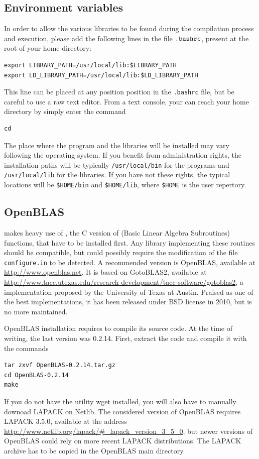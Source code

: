 \subsection{Environment variables}

In order to allow the various libraries to be found during the
compilation process and execution, please add
the following lines in the file $\verb|.bashrc|$, present at the
root of your home directory:
\begin{verbatim}
export LIBRARY_PATH=/usr/local/lib:$LIBRARY_PATH
export LD_LIBRARY_PATH=/usr/local/lib:$LD_LIBRARY_PATH
\end{verbatim}
This line can be placed at any position position in the
\verb|.bashrc| file, but be careful to use a raw text editor. From a
text console, your can reach your home directory by simply enter the
command
\begin{verbatim}
cd
\end{verbatim}

The place where the program and the libraries will be installed may vary
following the operating system.
If you benefit from administration rights, the installation paths will
be typically \verb|/usr/local/bin| for the programs and
\verb|/usr/local/lib| for the libraries.
If you have not these rights, the typical locations will be
\verb|$HOME/bin| and \verb|$HOME/lib|, where \verb|$HOME| is the user
repertory.

\subsection{OpenBLAS}
\label{sec:blas}

\oratio{} makes heavy use of \cblas{}, the C version of \blas{} (Basic Linear Algebra Subroutines) functions, that have to be installed first.
Any library implementing these routines should be compatible, but could possibly
require the modification of the file \verb|configure.in| to be
detected.
A recommended version is \textsf{OpenBLAS}, available at \url{http://www.openblas.net}.
It is based on \textsf{GotoBLAS2}, available at \url{http://www.tacc.utexas.edu/research-development/tacc-software/gotoblas2}, a \blas{} implementation proposed by the University of Texas at Austin.
Praised as one of the best implementations, it has been released under BSD license in 2010, but is no more maintained.

\textsf{OpenBLAS} installation requires to compile its source code. At the time of writing, the last version was 0.2.14. First, extract the code and compile it with the commands
\begin{verbatim}
tar zxvf OpenBLAS-0.2.14.tar.gz
cd OpenBLAS-0.2.14
make
\end{verbatim}
If you do not have the utility \textsf{wget} installed, you will also have to manually downoad LAPACK on Netlib.
The considered version of OpenBLAS requires LAPACK 3.5.0, available at the address \url{http://www.netlib.org/lapack/#_lapack_version_3_5_0}, but newer versions of OpenBLAS could rely on more recent LAPACK distributions.
The LAPACK archive has to be copied in the OpenBLAS main directory.


